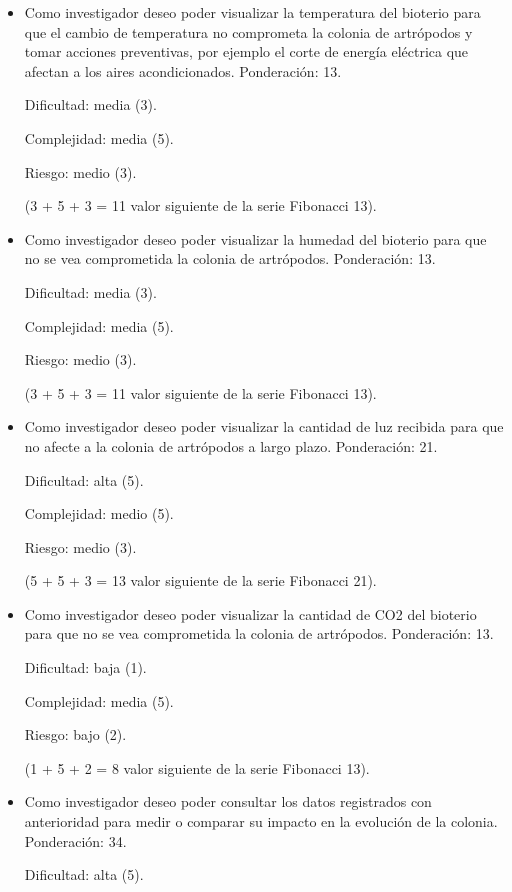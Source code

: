 \documentclass[
11pt, %
]{charter}
\begin{document}
\begin{itemize}
	\item Como investigador deseo poder visualizar la temperatura del bioterio para que el cambio de temperatura no comprometa la colonia de artrópodos y tomar acciones preventivas, por ejemplo el corte de energía eléctrica que afectan a los aires acondicionados.		
	Ponderación: 13.
	
	Dificultad: media (3).
	
	Complejidad: media (5).
	
	Riesgo: medio (3).
	
	(3 + 5 + 3 = 11 valor siguiente de la serie Fibonacci 13).

	\item Como investigador deseo poder visualizar la humedad del bioterio para que no se vea comprometida la colonia de artrópodos.
	Ponderación: 13.
	
	Dificultad: media (3).
	
	Complejidad: media (5).
	
	Riesgo: medio (3).
	
	(3 + 5 + 3 = 11 valor siguiente de la serie Fibonacci 13).
	
	\item Como investigador deseo poder visualizar la cantidad de luz recibida para  que no afecte a la colonia de artrópodos a largo plazo.
	Ponderación: 21.
	
	Dificultad: alta (5).
	
	Complejidad: medio (5).
	
	Riesgo: medio (3).
	
	(5 + 5 + 3 = 13 valor siguiente de la serie Fibonacci 21).
	
	\item Como investigador deseo poder visualizar la cantidad de CO2 del bioterio para que no se vea comprometida la colonia de artrópodos.
	Ponderación: 13.
	
	Dificultad: baja (1).
	
	Complejidad: media (5).
	
	Riesgo: bajo (2).
	
	(1 + 5 + 2 = 8 valor siguiente de la serie Fibonacci 13).
	
	\item Como investigador deseo poder consultar los datos registrados con anterioridad para medir o comparar su impacto en la evolución de la colonia.
	Ponderación: 34.
	
	Dificultad: alta (5).
	

\end{itemize}
\end{document}
